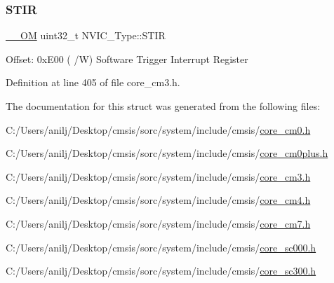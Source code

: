 \mbox{\label{struct_n_v_i_c___type_a37de89637466e007171c6b135299bc75}} 
\subsubsection{\texorpdfstring{S\+T\+IR}{STIR}}
{\footnotesize\ttfamily \hyperlink{core__sc300_8h_a0ea2009ed8fd9ef35b48708280fdb758}{\+\_\+\+\_\+\+OM} uint32\+\_\+t N\+V\+I\+C\+\_\+\+Type\+::\+S\+T\+IR}

Offset\+: 0x\+E00 ( /W) Software Trigger Interrupt Register 

Definition at line 405 of file core\+\_\+cm3.\+h.



The documentation for this struct was generated from the following files\+:\begin{DoxyCompactItemize}
\item 
C\+:/\+Users/anilj/\+Desktop/cmsis/sorc/system/include/cmsis/\hyperlink{core__cm0_8h}{core\+\_\+cm0.\+h}\item 
C\+:/\+Users/anilj/\+Desktop/cmsis/sorc/system/include/cmsis/\hyperlink{core__cm0plus_8h}{core\+\_\+cm0plus.\+h}\item 
C\+:/\+Users/anilj/\+Desktop/cmsis/sorc/system/include/cmsis/\hyperlink{core__cm3_8h}{core\+\_\+cm3.\+h}\item 
C\+:/\+Users/anilj/\+Desktop/cmsis/sorc/system/include/cmsis/\hyperlink{core__cm4_8h}{core\+\_\+cm4.\+h}\item 
C\+:/\+Users/anilj/\+Desktop/cmsis/sorc/system/include/cmsis/\hyperlink{core__cm7_8h}{core\+\_\+cm7.\+h}\item 
C\+:/\+Users/anilj/\+Desktop/cmsis/sorc/system/include/cmsis/\hyperlink{core__sc000_8h}{core\+\_\+sc000.\+h}\item 
C\+:/\+Users/anilj/\+Desktop/cmsis/sorc/system/include/cmsis/\hyperlink{core__sc300_8h}{core\+\_\+sc300.\+h}\end{DoxyCompactItemize}
